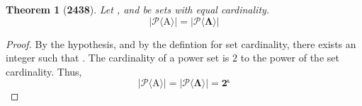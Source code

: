 \documentclass[preview]{standalone}
\newtheorem*{theorem*}{Theorem}
\begin{document}
\begin{theorem*}[\textbf{2438}]
    Let , and \bm{$\Lambda$} be sets with equal cardinality. 
    \begin{equation*}
        \bm{
            \Big| 
                \mathcal{P}\big \langle \mathrm{A} \big \rangle 
            \Big| 
                = 
            \Big|
                \mathcal{P} \big \langle \Lambda \big \rangle 
            \Big|
        }
    \end{equation*}
\end{theorem*}

\begin{proof}
    By the hypothesis, and by the defintion for set cardinality,
    there exists an integer \bm{$\iota$} such that 
    . 
    The cardinality of a power set is $2$ to the power of the set cardinality. 
    Thus,
    \begin{equation*}
        \bm{
            \big | \mathcal{P} \big \langle \mathrm{A} \big \rangle \big | 
                = 
            \big | \mathcal{P} \big \langle \Lambda \big \rangle \big | 
                = 
            2^{\iota}
        }        
    \end{equation*} 
\color{lightgray} \end{proof}
\end{document}
